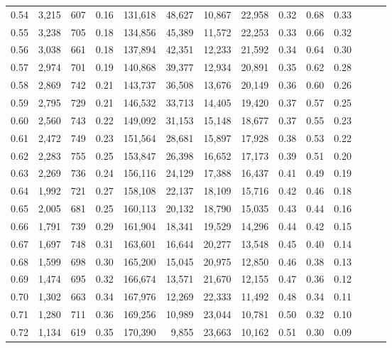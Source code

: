 \begin{tabular}{rrrrrrrrrrrrrr}
0.54 &  3,215 &  607 &  0.16 &  131,618 &   48,627 &  10,867 &  22,958 &  0.32 &  0.68 &      0.33 \\
0.55 &  3,238 &  705 &  0.18 &  134,856 &   45,389 &  11,572 &  22,253 &  0.33 &  0.66 &      0.32 \\
0.56 &  3,038 &  661 &  0.18 &  137,894 &   42,351 &  12,233 &  21,592 &  0.34 &  0.64 &      0.30 \\
0.57 &  2,974 &  701 &  0.19 &  140,868 &   39,377 &  12,934 &  20,891 &  0.35 &  0.62 &      0.28 \\
0.58 &  2,869 &  742 &  0.21 &  143,737 &   36,508 &  13,676 &  20,149 &  0.36 &  0.60 &      0.26 \\
0.59 &  2,795 &  729 &  0.21 &  146,532 &   33,713 &  14,405 &  19,420 &  0.37 &  0.57 &      0.25 \\
0.60 &  2,560 &  743 &  0.22 &  149,092 &   31,153 &  15,148 &  18,677 &  0.37 &  0.55 &      0.23 \\
0.61 &  2,472 &  749 &  0.23 &  151,564 &   28,681 &  15,897 &  17,928 &  0.38 &  0.53 &      0.22 \\
0.62 &  2,283 &  755 &  0.25 &  153,847 &   26,398 &  16,652 &  17,173 &  0.39 &  0.51 &      0.20 \\
0.63 &  2,269 &  736 &  0.24 &  156,116 &   24,129 &  17,388 &  16,437 &  0.41 &  0.49 &      0.19 \\
0.64 &  1,992 &  721 &  0.27 &  158,108 &   22,137 &  18,109 &  15,716 &  0.42 &  0.46 &      0.18 \\
0.65 &  2,005 &  681 &  0.25 &  160,113 &   20,132 &  18,790 &  15,035 &  0.43 &  0.44 &      0.16 \\
0.66 &  1,791 &  739 &  0.29 &  161,904 &   18,341 &  19,529 &  14,296 &  0.44 &  0.42 &      0.15 \\
0.67 &  1,697 &  748 &  0.31 &  163,601 &   16,644 &  20,277 &  13,548 &  0.45 &  0.40 &      0.14 \\
0.68 &  1,599 &  698 &  0.30 &  165,200 &   15,045 &  20,975 &  12,850 &  0.46 &  0.38 &      0.13 \\
0.69 &  1,474 &  695 &  0.32 &  166,674 &   13,571 &  21,670 &  12,155 &  0.47 &  0.36 &      0.12 \\
0.70 &  1,302 &  663 &  0.34 &  167,976 &   12,269 &  22,333 &  11,492 &  0.48 &  0.34 &      0.11 \\
0.71 &  1,280 &  711 &  0.36 &  169,256 &   10,989 &  23,044 &  10,781 &  0.50 &  0.32 &      0.10 \\
0.72 &  1,134 &  619 &  0.35 &  170,390 &    9,855 &  23,663 &  10,162 &  0.51 &  0.30 &      0.09 \\

\end{tabular}
